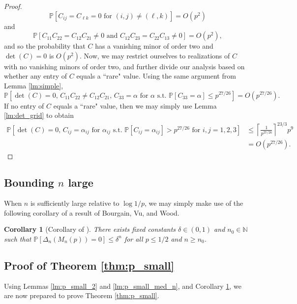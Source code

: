 \documentclass[reqno]{amsart}
\numberwithin{equation}{section}
\newtheorem{corollary}[theorem]{Corollary}
\begin{document}
\begin{proof}
\[\mathbb{P}[C_{ij} = C_{\ell k} = 0 \text{ for } (i,j) \ne (\ell,k)] = O(p^2)\]
and
\[\mathbb{P}[C_{11} C_{22} = C_{12} C_{21} \ne 0 \text{ and } C_{12} C_{23} = C_{22} C_{13} \ne 0] = O(p^2),\]
and so the probability that $C$ has a vanishing minor of order two and $\det(C) = 0$ is $O(p^2)$. Now, we may restrict ourselves to realizations of $C$ with no vanishing minors of order two, and further divide our analysis based on whether any entry of $C$ equals a ``rare" value. Using the same argument from Lemma \ref{lm:simple},
\[\mathbb{P} \left[\det(C) = 0, \, C_{11}C_{22} \ne C_{12} C_{21},\, C_{33} = \alpha \text{ for } \alpha \text{ s.t. } \mathbb{P}[C_{33} = \alpha] \le p^{27/26} \right] = O(p^{27/26}).\]
If no entry of $C$ equals a ``rare" value, then we may simply use Lemma \ref{lm:det_grid} to obtain
\begin{align*}
\mathbb{P} \left[ \det(C) = 0, \, C_{ij} = \alpha_{ij}\text{ for } \alpha_{ij} \text{ s.t. } \mathbb{P}[C_{ij} = \alpha_{ij}]> p^{27/26} \text{ for } i,j = 1,2,3\right] &\le \left\lceil \frac{1}{p^{27/26}} \right\rceil^{23/3} p^{9} \\
&= O(p^{27/26}).
\end{align*}
\end{proof}

\subsection{Bounding $n$ large} When $n$ is sufficiently large relative to $\log 1/p$, we may simply make use of the following corollary of a result of Bourgain, Vu, and Wood.

\begin{corollary}[Corollary of {\cite[Theorem 1.4]{bourgain2010singularity}}]\label{cor:p_small}
There exists fixed constants $\delta \in (0,1)$ and $n_0 \in \mathbb{N}$ such that $\mathbb{P} \left[ \Delta_n(M_n(p)) = 0 \right] \le \delta^n$
for all $p \le 1/2$ and $n \ge n_0$.
\end{corollary}


\subsection{Proof of Theorem \ref{thm:p_small}} Using Lemmas \ref{lm:p_small_2} and \ref{lm:p_small_med_n}, and Corollary \ref{cor:p_small}, we are now prepared to prove Theorem \ref{thm:p_small}.
\end{document}

